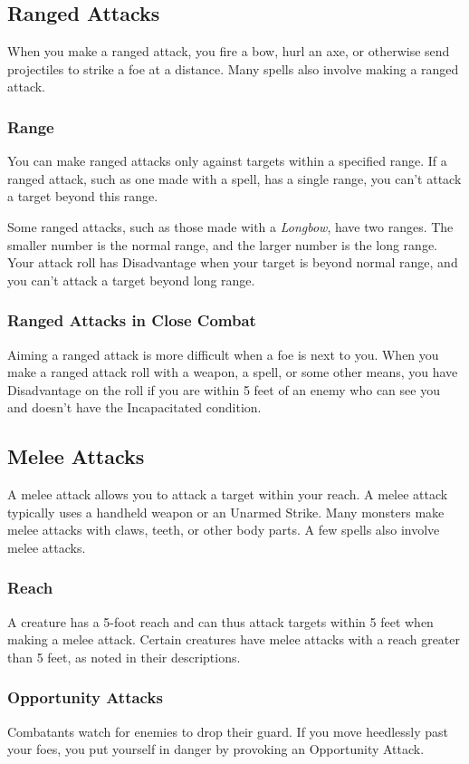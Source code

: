 \documentclass[10pt,a4paper,twoside,bg=print,twocolumn,openany,nodeprecatedcode]{dndbook}
\begin{document}
\subsection{Ranged Attacks}
When you make a ranged attack, you fire a bow, hurl an axe, or otherwise send projectiles to strike a foe at a distance. Many spells also involve making a ranged attack.

\subsubsection{Range}
You can make ranged attacks only against targets within a specified range. If a ranged attack, such as one made with a spell, has a single range, you can't attack a target beyond this range.

Some ranged attacks, such as those made with a \textit{Longbow}, have two ranges. The smaller number is the normal range, and the larger number is the long range. Your attack roll has Disadvantage when your target is beyond normal range, and you can't attack a target beyond long range.

\subsubsection{Ranged Attacks in Close Combat}
Aiming a ranged attack is more difficult when a foe is next to you. When you make a ranged attack roll with a weapon, a spell, or some other means, you have Disadvantage on the roll if you are within 5 feet of an enemy who can see you and doesn't have the Incapacitated condition.

\subsection{Melee Attacks}
A melee attack allows you to attack a target within your reach. A melee attack typically uses a handheld weapon or an Unarmed Strike. Many monsters make melee attacks with claws, teeth, or other body parts. A few spells also involve melee attacks.

\subsubsection{Reach}
A creature has a 5-foot reach and can thus attack targets within 5 feet when making a melee attack. Certain creatures have melee attacks with a reach greater than 5 feet, as noted in their descriptions.

\subsubsection{Opportunity Attacks}
Combatants watch for enemies to drop their guard. If you move heedlessly past your foes, you put yourself in danger by provoking an Opportunity Attack.
\end{document}
